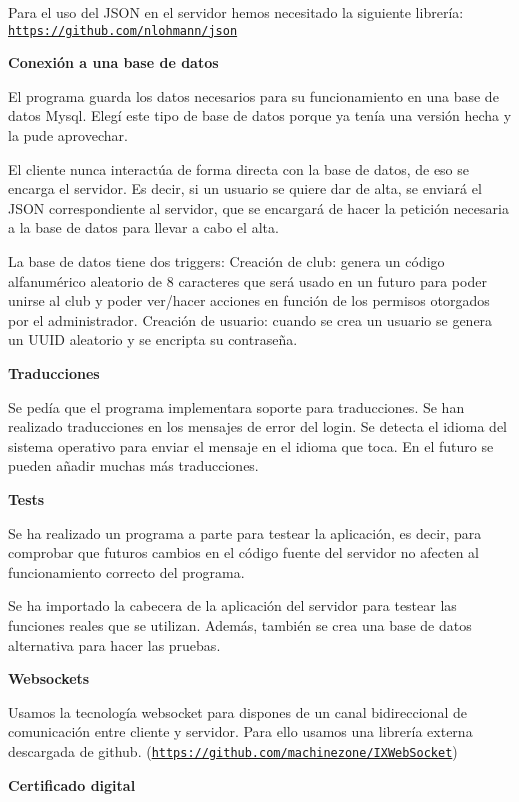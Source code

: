 Para el uso del J\+S\+ON en el servidor hemos necesitado la siguiente librería\+: \href{https://github.com/nlohmann/json}{\tt https\+://github.\+com/nlohmann/json}

{\bfseries Conexión a una base de datos}

El programa guarda los datos necesarios para su funcionamiento en una base de datos Mysql. Elegí este tipo de base de datos porque ya tenía una versión hecha y la pude aprovechar.

El cliente nunca interactúa de forma directa con la base de datos, de eso se encarga el servidor. Es decir, si un usuario se quiere dar de alta, se enviará el J\+S\+ON correspondiente al servidor, que se encargará de hacer la petición necesaria a la base de datos para llevar a cabo el alta.

La base de datos tiene dos triggers\+: Creación de club\+: genera un código alfanumérico aleatorio de 8 caracteres que será usado en un futuro para poder unirse al club y poder ver/hacer acciones en función de los permisos otorgados por el administrador. Creación de usuario\+: cuando se crea un usuario se genera un U\+U\+ID aleatorio y se encripta su contraseña.

{\bfseries Traducciones}

Se pedía que el programa implementara soporte para traducciones. Se han realizado traducciones en los mensajes de error del login. Se detecta el idioma del sistema operativo para enviar el mensaje en el idioma que toca. En el futuro se pueden añadir muchas más traducciones.

{\bfseries Tests}

Se ha realizado un programa a parte para testear la aplicación, es decir, para comprobar que futuros cambios en el código fuente del servidor no afecten al funcionamiento correcto del programa.

Se ha importado la cabecera de la aplicación del servidor para testear las funciones reales que se utilizan. Además, también se crea una base de datos alternativa para hacer las pruebas.

{\bfseries Websockets}

Usamos la tecnología websocket para dispones de un canal bidireccional de comunicación entre cliente y servidor. Para ello usamos una librería externa descargada de github. (\href{https://github.com/machinezone/IXWebSocket}{\tt https\+://github.\+com/machinezone/\+I\+X\+Web\+Socket})

{\bfseries Certificado digital}

